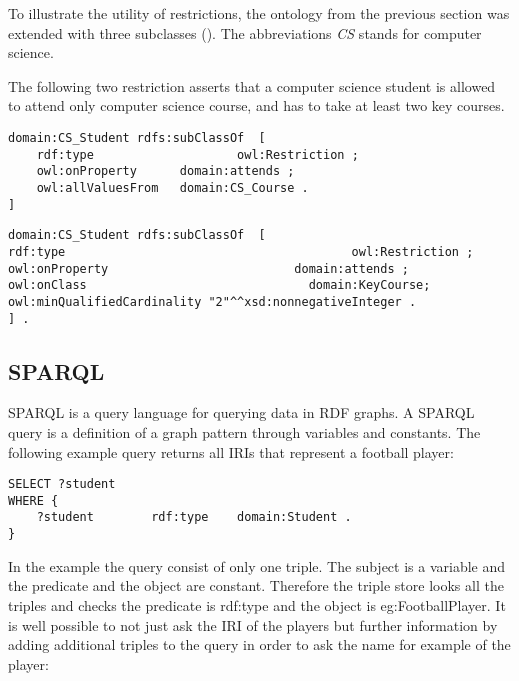 To illustrate the utility of restrictions, the ontology from the previous section was extended with three subclasses (). The abbreviations \textit{CS} stands for computer science.



The following two restriction asserts that a computer science student is allowed to attend only computer science course, and has to take at least two key courses.

\begin{lstlisting}[basicstyle=\footnotesize, captionpos=b, caption=Restriction blank nodes, label=lst:sparql, belowskip=1em, aboveskip=2em,
frame=single]
domain:CS_Student rdfs:subClassOf  [ 
	rdf:type					owl:Restriction ; 
	owl:onProperty		domain:attends ; 
	owl:allValuesFrom	domain:CS_Course .
]
\end{lstlisting}


\begin{lstlisting}[basicstyle=\footnotesize, captionpos=b, caption=Restriction blank nodes, label=lst:sparql, belowskip=1em, aboveskip=2em,
frame=single]
domain:CS_Student rdfs:subClassOf  [
rdf:type										owl:Restriction ; 
owl:onProperty							domain:attends ; 
owl:onClass								  domain:KeyCourse; 
owl:minQualifiedCardinality "2"^^xsd:nonnegativeInteger .
] .
\end{lstlisting}


\subsection{SPARQL}

SPARQL is a query language for querying data in RDF graphs. A SPARQL query is a definition of a graph pattern through variables and constants. The following example query returns all IRIs that represent a football player: 

\begin{lstlisting}[captionpos=b, caption=SPARQL Query I., label=lst:sparql, belowskip=1em, aboveskip=2em, 
basicstyle=\footnotesize,frame=single]
SELECT ?student  
WHERE { 
	?student		rdf:type	domain:Student .	
}
\end{lstlisting}

In the example the query consist of only one triple. The subject is a variable and the predicate and the object are constant. Therefore the triple store looks all the triples and checks the predicate is rdf:type and the object is eg:FootballPlayer. 
It is well possible to not just ask the IRI of the players but further information by adding additional triples to the query in order to ask the name for example of the player:

